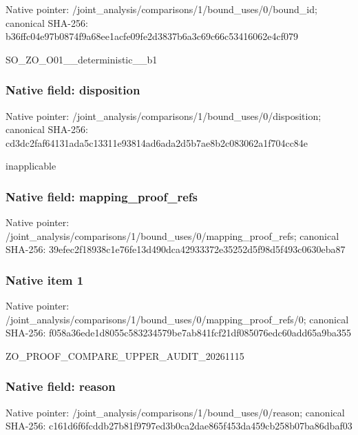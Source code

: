 \documentclass[10pt,a4paper]{article}
\begin{document}
Native pointer: /joint\_analysis/comparis\allowbreak{}ons/1/bound\_uses/0/bound\allowbreak{}\_id; canonical SHA-256: b36ffc04e97b0874f9a68ee1\allowbreak{}acfe09fe2d3837b6a3c69c66\allowbreak{}c53416062e4cf079


SO\_ZO\_O01\_\_deterministic\_\_b1


\subsubsection{Native field: disposition}


Native pointer: /joint\_analysis/comparis\allowbreak{}ons/1/bound\_uses/0/dispo\allowbreak{}sition; canonical SHA-256: cd3dc2faf64131ada5c13311\allowbreak{}e93814ad6ada2d5b7ae8b2c0\allowbreak{}83062a1f704cc84e


inapplicable


\subsubsection{Native field: mapping\_proof\_refs}


Native pointer: /joint\_analysis/comparis\allowbreak{}ons/1/bound\_uses/0/mappi\allowbreak{}ng\_proof\_refs; canonical SHA-256: 39efec2f18938c1e76fe13d4\allowbreak{}90dca42933372e35252d5f98\allowbreak{}d5f493c0630eba87



\subsubsection{Native item 1}


Native pointer: /joint\_analysis/comparis\allowbreak{}ons/1/bound\_uses/0/mappi\allowbreak{}ng\_proof\_refs/0; canonical SHA-256: f058a36ede1d8055c5832345\allowbreak{}79be7ab841fcf21df085076e\allowbreak{}dc60add65a9ba355


ZO\_PROOF\_COMPARE\_UPPER\_AUDIT\_20261115


\subsubsection{Native field: reason}


Native pointer: /joint\_analysis/comparis\allowbreak{}ons/1/bound\_uses/0/reaso\allowbreak{}n; canonical SHA-256: c161d6f6fcddb27b81f9797e\allowbreak{}d3b0ca2dae865f453da459cb\allowbreak{}258b07ba86dbaf03
\end{document}
